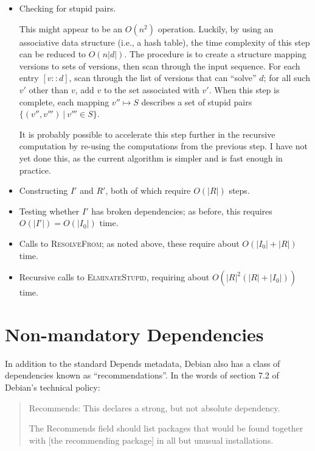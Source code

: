 \documentclass[letterpaper]{article}
\theoremstyle{definition}
\theoremstyle{remark}
\newcommand{\st}{\ |\ }
\newcommand{\len}[1]{\lvert#1\rvert}
\newcommand{\act}[2]{[#1 :: #2]}
\begin{document}
\begin{itemize}
\item Checking for stupid pairs.

  This might appear to be an $O(n^2)$ operation.  Luckily, by using an
  associative data structure (i.e., a hash table), the time complexity
  of this step can be reduced to $O(n\len{d})$.  The procedure is to
  create a structure mapping versions to sets of versions, then scan
  through the input sequence.  For each entry $\act{v}{d}$, scan
  through the list of versions that can ``solve'' $d$; for all such
  $v'$ other than $v$, add $v$ to the set associated with $v'$.  When
  this step is complete, each mapping $v'' \mapsto S$ describes a set
  of stupid pairs $\{(v'',v''') \st v''' \in S\}$.

  It is probably possible to accelerate this step further in the
  recursive computation by re-using the computations from the previous
  step.  I have not yet done this, as the current algorithm is simpler
  and is fast enough in practice.

\item Constructing $I'$ and $R'$, both of which require $O(\len{R})$
  steps.

\item Testing whether $I'$ has broken dependencies; as before, this
  requires $O(\len{I'})=O(\len{I_0})$ time.

\item Calls to \textsc{ResolveFrom}; as noted above, these require
  about $O(\len{I_0}+\len{R})$ time.

\item Recursive calls to \textsc{ElminateStupid}, requiring about
  $O(\len{R}^2(\len{R}+\len{I_0}))$ time.
\end{itemize}



\section{Non-mandatory Dependencies}

In addition to the standard Depends metadata, Debian also has a class
of dependencies known as ``recommendations''.  In the words of section
7.2 of Debian's technical policy:

\begin{quote}
  Recommends: This declares a strong, but not absolute dependency.

  The Recommends field should list packages that would be found
  together with [the recommending package] in all but unusual
  installations.
\end{quote}
\end{document}

